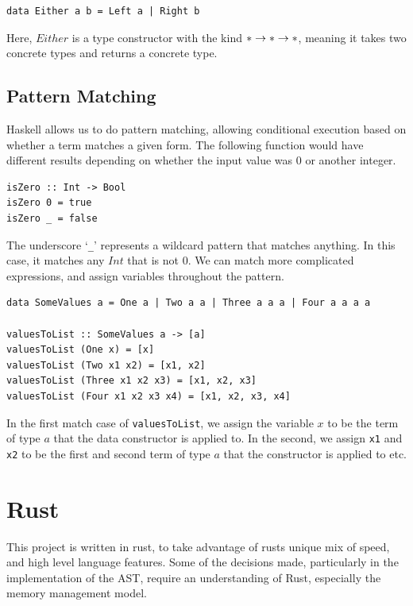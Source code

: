 \begin{lstlisting}[language=SFL]
data Either a b = Left a | Right b
\end{lstlisting} 

Here, $Either$ is a type constructor with the kind $* \rightarrow * \rightarrow *$, meaning it takes two concrete types and returns a concrete type. 

\subsection{Pattern Matching}
\label{bg:haskell_pattern_match}
Haskell allows us to do pattern matching, allowing conditional execution based on whether a term matches a given form. The following function would have different results depending on whether the input value was 0 or another integer.

\begin{lstlisting}[language=SFL]
isZero :: Int -> Bool
isZero 0 = true
isZero _ = false
\end{lstlisting}

\noindent The underscore `\verb|_|' represents a wildcard pattern that matches anything. In this case, it matches any $Int$ that is not $0$. We can match more complicated expressions, and assign variables throughout the pattern.

\begin{lstlisting}[language=SFL]
data SomeValues a = One a | Two a a | Three a a a | Four a a a a

valuesToList :: SomeValues a -> [a]
valuesToList (One x) = [x]
valuesToList (Two x1 x2) = [x1, x2]
valuesToList (Three x1 x2 x3) = [x1, x2, x3]
valuesToList (Four x1 x2 x3 x4) = [x1, x2, x3, x4]
\end{lstlisting}

\noindent In the first match case of \verb|valuesToList|, we assign the variable $x$ to be the term of type $a$ that the data constructor  is applied to. In the second, we assign \verb|x1| and \verb|x2| to be the first and second term of type $a$ that the constructor  is applied to etc. 

\section{Rust}
\label{bg:rust}

This project is written in rust, to take advantage of rusts unique mix of speed, and high level language features. Some of the decisions made, particularly in the implementation of the AST, require an understanding of Rust, especially the memory management model.

